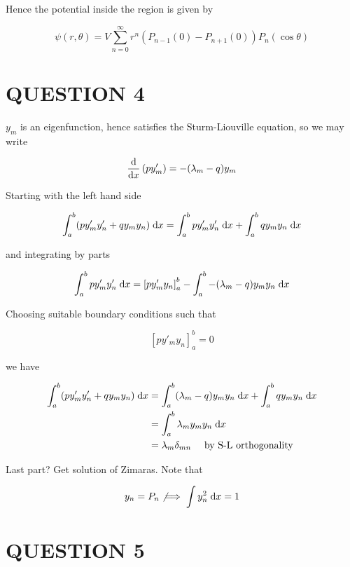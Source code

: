 \documentclass[a4paper]{article}
\begin{document}
Hence the potential inside the region is given by

\[ \psi (r,\theta) =  V \sum_{n=0}^{\infty} r^{n} (  P_{n-1}(0) - P_{n+1}(0) )   P_{n} (\cos \theta)   \]





\section{QUESTION 4}


$ y_{m} $ is an eigenfunction, hence satisfies the Sturm-Liouville equation, so we may write

\[ \frac{\mathrm{d} }{\mathrm{d} x} \left( p y_{m}' \right) = - ( \lambda_{m} - q)y_{m}     \]

Starting with the left hand side

\begin{align*}
\int_{a}^{b}  (p y'_{m}  y'_{n} + q y_{m}y_{n} ) \; \mathrm{d} x & = \int_{a}^{b} p y'_{m}  y'_{n} \; \mathrm{d} x + \int_{a}^{b} q y_{m}y_{n} \; \mathrm{d} x \\
\end{align*}

and integrating by parts

\begin{align*}
\int_{a}^{b} p y'_{m}  y'_{n} \; \mathrm{d} x & =  \left[  p y'_{m} y_{n} \right]_{a}^{b} - \int_{a}^{b} - ( \lambda_{m} - q)y_{m} y_{n} \; \mathrm{d} x   \\
\end{align*}

Choosing suitable boundary conditions such that

\[ \left[  p y'_{m} y_{n} \right]_{a}^{b} = 0 \]

we have 

\begin{align*}
\int_{a}^{b}  (p y'_{m}  y'_{n} + q y_{m}y_{n} ) \; \mathrm{d} x & =  \int_{a}^{b} ( \lambda_{m} - q)y_{m} y_{n} \; \mathrm{d} x  + \int_{a}^{b} q y_{m}y_{n} \; \mathrm{d} x \\
& =  \int_{a}^{b} \lambda_{m}y_{m} y_{n} \; \mathrm{d} x  \\
& = \lambda_{m} \delta_{mn} \quad \text{ by S-L orthogonality}
\end{align*}

Last part? Get solution of Zimaras. Note that 

\[ y_{n} = P_{n} \not\implies \int y_{n}^{2} \; \mathrm{d} x = 1 \]


\section{QUESTION 5}
\end{document}
